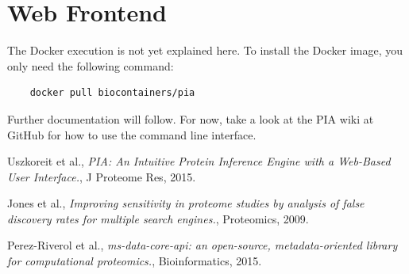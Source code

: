 \documentclass[a4paper,11pt,twoside]{article}
\begin{document}
\newpage
\section{Web Frontend}

The Docker execution is not yet explained here. To install the Docker image,
you only need the following command:

\begin{verbatim}
	docker pull biocontainers/pia
\end{verbatim}

Further documentation will follow. For now, take a look at the PIA wiki at
GitHub for how to use the command line interface.




\newpage
\begin{thebibliography}{9}
	Uszkoreit et al.,
	\emph{PIA: An Intuitive Protein Inference Engine with a Web-Based User
	Interface.},
	J Proteome Res,
	2015.

	Jones et al.,
	\emph{Improving sensitivity in proteome studies by analysis of false
	discovery rates for multiple search engines.},
	Proteomics,
	2009.

	Perez-Riverol et al.,
	\emph{ms-data-core-api: an open-source, metadata-oriented library for
	computational proteomics.},
	Bioinformatics,
	2015.
\end{thebibliography}
\end{document}
